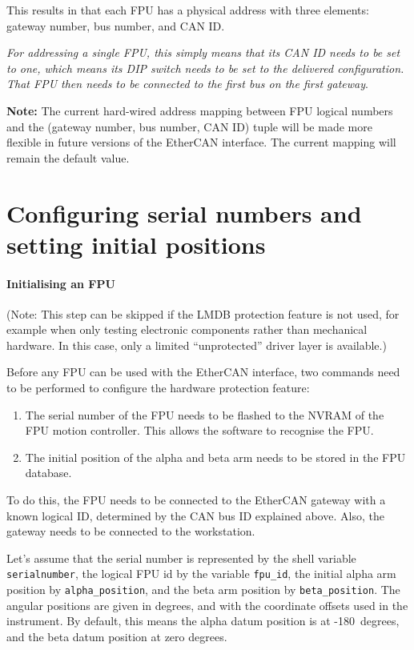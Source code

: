 \documentclass[fontsize=12,a4paper]{scrreprt}
\begin{document}
This results in that each FPU has a physical address with three
elements: gateway number, bus number, and CAN ID.

\emph{For addressing a single FPU, this simply means that its CAN ID
  needs to be set to one, which means its DIP switch needs to be set
  to the delivered configuration. That FPU then needs to be connected
  to the first bus on the first gateway}.

\textbf{Note:} The current hard-wired address mapping between FPU
logical numbers and the (gateway number, bus number, CAN ID) tuple
will be made more flexible in future versions of the EtherCAN
interface. The current mapping will remain the default value.

\section{Configuring serial numbers and setting initial positions}
\label{sec:setinitialposition}

\paragraph{Initialising an FPU}

(Note: This step can be skipped if the LMDB protection feature is not
used, for example when only testing electronic components rather than
mechanical hardware. In this case, only a limited ``unprotected''
driver layer is available.)

Before any FPU can be used with the EtherCAN interface, two commands
need to be performed to configure the hardware protection feature:

\begin{enumerate}
\item The serial number of the FPU needs to be flashed to the
  NVRAM of the FPU motion controller. This allows the software
  to recognise the FPU.
\item The initial position of the alpha and beta arm needs to
  be stored in the FPU database.
\end{enumerate}

To do this, the FPU needs to be connected to the EtherCAN gateway with
a known logical ID, determined by the CAN bus ID explained
above. Also, the gateway needs to be connected to the workstation.

Let's assume that the serial number is represented by the shell
variable \texttt{serialnumber}, the logical FPU id by the variable
\texttt{fpu\_id}, the initial alpha arm position by
\texttt{alpha\_position}, and the beta arm position by
\texttt{beta\_position}. The angular positions are given in degrees,
and with the coordinate offsets used in the instrument. By default,
this means the alpha datum position is at -180\degree\ degrees, and the beta
datum position at zero degrees.
\end{document}
